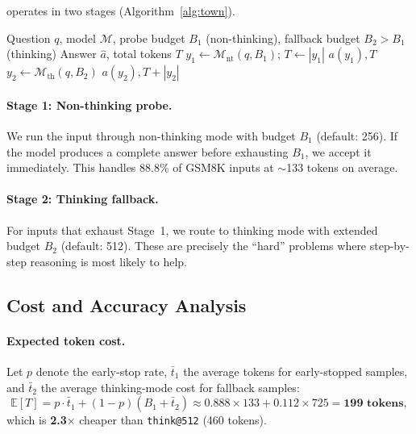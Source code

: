 \method{} operates in two stages (Algorithm~\ref{alg:town}).

\begin{algorithm}[t]
\caption{\method{}: Think Only When Needed}
\label{alg:town}
\begin{algorithmic}[1]
\Require Question $q$, model $\mathcal{M}$,
  probe budget $B_1$ (non-thinking),
  fallback budget $B_2 > B_1$ (thinking)
\Ensure Answer $\hat{a}$, total tokens $T$
\State $y_1 \leftarrow \mathcal{M}_{\textrm{nt}}(q, B_1)$; $T \leftarrow |y_1|$
 
  \State \Return $a(y_1), T$
\Else {}
  \State $y_2 \leftarrow \mathcal{M}_{\textrm{th}}(q, B_2)$
  \State \Return $a(y_2), T + |y_2|$
\EndIf
\end{algorithmic}
\end{algorithm}

\paragraph{Stage 1: Non-thinking probe.}
We run the input through non-thinking mode with budget $B_1$ (default: 256).
If the model produces a complete answer before exhausting $B_1$, we accept it immediately.
This handles 88.8\% of GSM8K inputs at ${\sim}$133 tokens on average.

\paragraph{Stage 2: Thinking fallback.}
For inputs that exhaust Stage~1, we route to thinking mode with extended budget $B_2$ (default: 512).
These are precisely the ``hard'' problems where step-by-step reasoning is most likely to help.

\subsection{Cost and Accuracy Analysis}
\label{sec:method:analysis}

\paragraph{Expected token cost.}
Let $p$ denote the early-stop rate, $\bar{t}_1$ the average tokens for early-stopped samples, and $\bar{t}_2$ the average thinking-mode cost for fallback samples:
\begin{equation}
  \mathbb{E}[T] = p \cdot \bar{t}_1 + (1 - p)(B_1 + \bar{t}_2) \approx 0.888 \times 133 + 0.112 \times 725 = \mathbf{199\text{ tokens}},
  \label{eq:town-cost}
\end{equation}
which is \textbf{2.3$\times$} cheaper than \texttt{think@512} (460 tokens).

